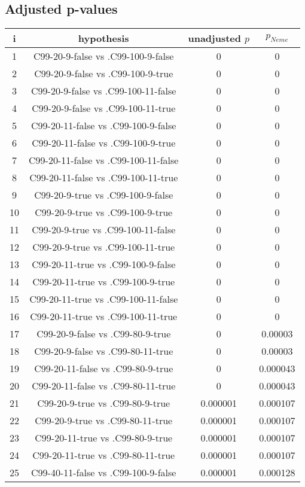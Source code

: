 \documentclass[a4paper,10pt]{article}
\begin{document}
\begin{landscape}
\pagebreak

\subsection{Adjusted p-values}

\begin{table}[!htp]
\centering\scriptsize
\begin{tabular}{cccc}
i&hypothesis&unadjusted $p$&$p_{Neme}$\\
\hline1&C99-20-9-false vs .C99-100-9-false&0&0\\
2&C99-20-9-false vs .C99-100-9-true&0&0\\
3&C99-20-9-false vs .C99-100-11-false&0&0\\
4&C99-20-9-false vs .C99-100-11-true&0&0\\
5&C99-20-11-false vs .C99-100-9-false&0&0\\
6&C99-20-11-false vs .C99-100-9-true&0&0\\
7&C99-20-11-false vs .C99-100-11-false&0&0\\
8&C99-20-11-false vs .C99-100-11-true&0&0\\
9&C99-20-9-true vs .C99-100-9-false&0&0\\
10&C99-20-9-true vs .C99-100-9-true&0&0\\
11&C99-20-9-true vs .C99-100-11-false&0&0\\
12&C99-20-9-true vs .C99-100-11-true&0&0\\
13&C99-20-11-true vs .C99-100-9-false&0&0\\
14&C99-20-11-true vs .C99-100-9-true&0&0\\
15&C99-20-11-true vs .C99-100-11-false&0&0\\
16&C99-20-11-true vs .C99-100-11-true&0&0\\
17&C99-20-9-false vs .C99-80-9-true&0&0.00003\\
18&C99-20-9-false vs .C99-80-11-true&0&0.00003\\
19&C99-20-11-false vs .C99-80-9-true&0&0.000043\\
20&C99-20-11-false vs .C99-80-11-true&0&0.000043\\
21&C99-20-9-true vs .C99-80-9-true&0.000001&0.000107\\
22&C99-20-9-true vs .C99-80-11-true&0.000001&0.000107\\
23&C99-20-11-true vs .C99-80-9-true&0.000001&0.000107\\
24&C99-20-11-true vs .C99-80-11-true&0.000001&0.000107\\
25&C99-40-11-false vs .C99-100-9-false&0.000001&0.000128\\

\end{tabular}
\end{table}
\end{landscape}
\end{document}

